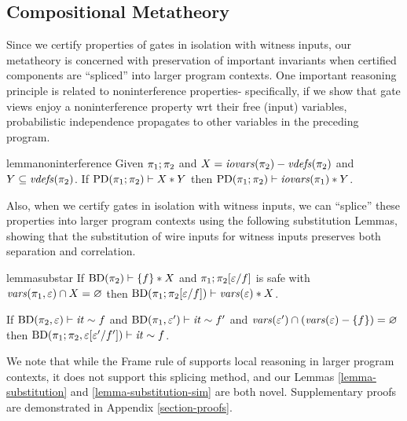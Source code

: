 \subsection{Compositional Metatheory}

Since we certify properties of gates in isolation with witness inputs,
our metatheory is concerned with preservation of important invariants
when certified components are ``spliced'' into larger program
contexts.  One important reasoning principle is related to
noninterference properties- specifically, if we show that gate views
enjoy a noninterference property wrt their free (input) variables,
probabilistic independence propagates to other variables in the
preceding program.
\begin{restatable}[Noninterference]{lemma}{noninterference}
  \label{lemma-noninterference}
  Given $\pi_1;\pi_2$ and $X = \mathit{iovars}(\pi_2) - \mathit{vdefs}(\pi_2)$ and
  $Y \subseteq \mathit{vdefs}(\pi_2)$. If $\mathrm{PD}(\pi_1;\pi_2) \vdash X * Y$
  then $\mathrm{PD}(\pi_1;\pi_2) \vdash \mathit{iovars}(\pi_1) * Y$.
\end{restatable}

Also, when we certify gates in isolation with witness inputs, we can
``splice'' these properties into larger program contexts using the
following substitution Lemmas, showing that the substitution of
wire inputs for witness inputs preserves both separation and correlation.
\begin{restatable}[Substitution$*$]{lemma}{substar}
  \label{lemma-substitution}
  If $\mathrm{BD}(\pi_2) \vdash \{ f \} * X$ and
  $\pi_1;\pi_2[\varepsilon/f]$ is safe with $\mathit{vars}(\pi_1,\varepsilon) \cap
  X = \varnothing$ then
  $\mathrm{BD}(\pi_1;\pi_2[\varepsilon/f]) \vdash \mathit{vars}(\varepsilon) * X$.
\end{restatable}

\begin{lemma}
  \label{lemma-substitution-sim}
  If $\mathrm{BD}(\pi_2,\varepsilon) \vdash \mathit{it} \sim f$ and $\mathrm{BD}(\pi_1,\varepsilon') \vdash \mathit{it} \sim f'$
  and $\mathit{vars}(\varepsilon') \cap (\mathit{vars}(\varepsilon) - \{ f \}) = \varnothing$
  then $\mathrm{BD}(\pi_1;\pi_2,\varepsilon[\varepsilon'/f']) \vdash \mathit{it} \sim f$.
\end{lemma}

We note that while the Frame rule of \cite{barthe2019probabilistic}
supports local reasoning in larger program contexts, it does not
support this splicing method, and our Lemmas \ref{lemma-substitution}
and \ref{lemma-substitution-sim} are both novel. Supplementary proofs
are demonstrated in Appendix \ref{section-proofs}.
